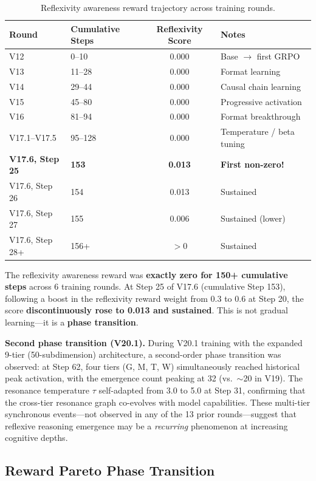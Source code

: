 \documentclass{article}
\begin{document}
\begin{table}[h]
\centering
\caption{Reflexivity awareness reward trajectory across training rounds.}
\label{tab:phase-transition}
\begin{tabular}{@{}llcl@{}}
\toprule
\textbf{Round} & \textbf{Cumulative Steps} & \textbf{Reflexivity Score} & \textbf{Notes} \\
\midrule
V12 & 0--10 & 0.000 & Base $\to$ first GRPO \\
V13 & 11--28 & 0.000 & Format learning \\
V14 & 29--44 & 0.000 & Causal chain learning \\
V15 & 45--80 & 0.000 & Progressive activation \\
V16 & 81--94 & 0.000 & Format breakthrough \\
V17.1--V17.5 & 95--128 & 0.000 & Temperature / beta tuning \\
\midrule
\textbf{V17.6, Step 25} & \textbf{153} & \textbf{0.013} & \textbf{First non-zero!} \\
V17.6, Step 26 & 154 & 0.013 & Sustained \\
V17.6, Step 27 & 155 & 0.006 & Sustained (lower) \\
V17.6, Step 28+ & 156+ & $> 0$ & Sustained \\
\bottomrule
\end{tabular}
\end{table}

The reflexivity awareness reward was \textbf{exactly zero for 150+ cumulative steps} across 6 training rounds. At Step 25 of V17.6 (cumulative Step 153), following a boost in the reflexivity reward weight from 0.3 to 0.6 at Step 20, the score \textbf{discontinuously rose to 0.013 and sustained}. This is not gradual learning---it is a \textbf{phase transition}.

\textbf{Second phase transition (V20.1).} During V20.1 training with the expanded 9-tier (50-subdimension) architecture, a second-order phase transition was observed: at Step 62, four tiers (G, M, T, W) simultaneously reached historical peak activation, with the emergence count peaking at 32 (vs.\ $\sim$20 in V19). The resonance temperature $\tau$ self-adapted from 3.0 to 5.0 at Step 31, confirming that the cross-tier resonance graph co-evolves with model capabilities. These multi-tier synchronous events---not observed in any of the 13 prior rounds---suggest that reflexive reasoning emergence may be a \textit{recurring} phenomenon at increasing cognitive depths.

\subsection{Reward Pareto Phase Transition}
\end{document}
